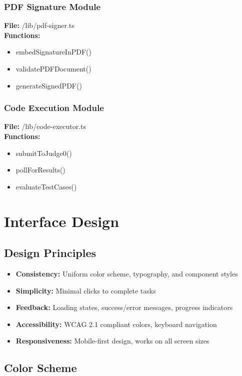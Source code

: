 \subsubsection{PDF Signature Module}
\textbf{File:} /lib/pdf-signer.ts\\
\textbf{Functions:}
\begin{itemize}
\item embedSignatureInPDF()
\item validatePDFDocument()
\item generateSignedPDF()
\end{itemize}

\subsubsection{Code Execution Module}
\textbf{File:} /lib/code-executor.ts\\
\textbf{Functions:}
\begin{itemize}
\item submitToJudge0()
\item pollForResults()
\item evaluateTestCases()
\end{itemize}

\section{Interface Design}

\subsection{Design Principles}

\begin{itemize}
\item \textbf{Consistency:} Uniform color scheme, typography, and component styles
\item \textbf{Simplicity:} Minimal clicks to complete tasks
\item \textbf{Feedback:} Loading states, success/error messages, progress indicators
\item \textbf{Accessibility:} WCAG 2.1 compliant colors, keyboard navigation
\item \textbf{Responsiveness:} Mobile-first design, works on all screen sizes
\end{itemize}

\subsection{Color Scheme}

